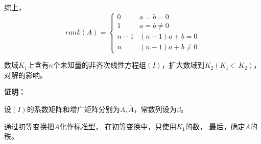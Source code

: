 \documentclass{article}
\begin{document}
综上，
\begin{equation*}
  rank(A) = \begin{cases}
    0     & a = b = 0           \\
    1     & a = b \neq 0        \\
    n - 1 & (n - 1)a + b = 0    \\
    n     & (n - 1)a + b \neq 0
  \end{cases}
\end{equation*}

\begin{zremark}
  数域$K_1$上含有$n$个未知量的非齐次线性方程组$(I)$，扩大数域到$K_2(K_1 \subset K_2)$，
  对解的影响。
\end{zremark}

\textbf{证明：}

设$(I)$的系数矩阵和增广矩阵分别为$A, \overline{A}$，常数列设为$\beta$。

通过初等变换把$A$化作标准型，
在初等变换中，只使用$K_1$的数，
最后，确定$A$的秩。
\end{document}
